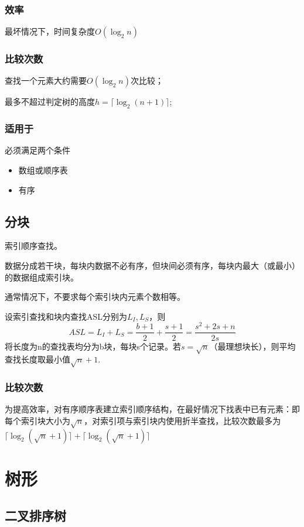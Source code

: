 \subsubsection{效率}
最坏情况下，时间复杂度\(O(\log_2n)\)


\subsubsection{比较次数}
查找一个元素大约需要\(O(\log_2n)\)次比较；

最多不超过判定树的高度\(h = \lceil\log_2(n + 1)\rceil\);


\subsubsection{适用于}
必须满足两个条件
\begin{itemize}
    \item 数组或顺序表
    \item 有序
\end{itemize}


\subsection{分块}
索引顺序查找。

数据分成若干块，每块内数据不必有序，但块间必须有序，每块内最大（或最小）的数据组成索引块。

通常情况下，不要求每个索引块内元素个数相等。



设索引查找和块内查找ASL分别为\(L_I, L_S\)，则
\[ASL = L_I + L_S = \dfrac{b + 1}{2} + \dfrac{s + 1}{2} = \dfrac{s^2 + 2s + n}{2s}\]
将长度为n的查找表均分为b块，每块s个记录。若\(s = \sqrt{n}\)（最理想块长），则平均查找长度取最小值\(\sqrt{n} + 1\).


\subsubsection{比较次数}
为提高效率，对有序顺序表建立索引顺序结构，在最好情况下找表中已有元素：即每个索引块大小为\(\sqrt{n}\)，对索引项与索引块内使用折半查找，比较次数最多为\(\lceil\log_2(\sqrt{n} + 1)\rceil + \lceil\log_2(\sqrt{n} + 1)\rceil\)


\section{树形}

\subsection{二叉排序树}

